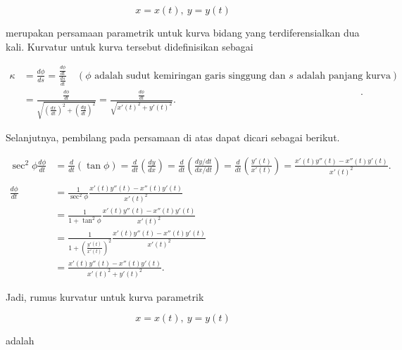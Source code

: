 \documentclass[a4paper,10pt]{article}
\begin{document}
\begin{eulernotebook}
\begin{eulercomment}
\end{eulercomment}
\begin{eulerformula}
\[
x = x(t),\ y= y(t)
\]
\end{eulerformula}
\begin{eulercomment}
merupakan persamaan parametrik untuk kurva bidang yang
terdiferensialkan dua kali. Kurvatur untuk kurva tersebut
didefinisikan sebagai

\end{eulercomment}
\begin{eulerformula}
\[
\begin{aligned}\kappa &= \frac{d\phi}{ds}=\frac{\frac{d\phi}{dt}}{\frac{ds}{dt}}\quad (\phi \text{ adalah sudut kemiringan garis singgung dan }s \text{ adalah panjang kurva})\\ &=\frac{\frac{d\phi}{dt}}{\sqrt{(\frac{dx}{dt})^2+(\frac{dy}{dt})^2}}= \frac{\frac{d\phi}{dt}}{\sqrt{x'(t)^2+y'(t)^2}}.\end{aligned}.
\]
\end{eulerformula}
\begin{eulercomment}
Selanjutnya, pembilang pada persamaan di atas dapat dicari sebagai
berikut.

\end{eulercomment}
\begin{eulerformula}
\[
\begin{aligned}\sec^2\phi\frac{d\phi}{dt} &= \frac{d}{dt}\left(\tan\phi\right)= \frac{d}{dt}\left(\frac{dy}{dx}\right)= \frac{d}{dt}\left(\frac{dy/dt}{dx/dt}\right)= \frac{d}{dt}\left(\frac{y'(t)}{x'(t)}\right)=\frac{x'(t)y''(t)-x''(t)y'(t)}{x'(t)^2}.\\ & \\ \frac{d\phi}{dt} &= \frac{1}{\sec^2\phi}\frac{x'(t)y''(t)-x''(t)y'(t)}{x'(t)^2}\\ &= \frac{1}{1+\tan^2\phi}\frac{x'(t)y''(t)-x''(t)y'(t)}{x'(t)^2}\\ &= \frac{1}{1+\left(\frac{y'(t)}{x'(t)}\right)^2}\frac{x'(t)y''(t)-x''(t)y'(t)}{x'(t)^2}\\ &= \frac{x'(t)y''(t)-x''(t)y'(t)}{x'(t)^2+y'(t)^2}.\end{aligned}
\]
\end{eulerformula}
\begin{eulercomment}
Jadi, rumus kurvatur untuk kurva parametrik

\end{eulercomment}
\begin{eulerformula}
\[
x=x(t),\ y=y(t)
\]
\end{eulerformula}
\begin{eulercomment}
adalah


\end{eulercomment}
\end{eulernotebook}
\end{document}
